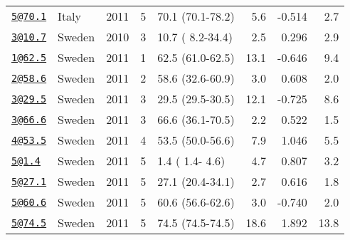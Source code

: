 \documentclass[
]{article}
\begin{document}
\begin{longtable}[]{@{}llrrlrrr@{}}
\href{mailto:5@70.1}{\nolinkurl{5@70.1}} & Italy & 2011 & 5 & 70.1 (70.1-78.2) & 5.6 & -0.514 & 2.7\tabularnewline
\href{mailto:3@10.7}{\nolinkurl{3@10.7}} & Sweden & 2010 & 3 & 10.7 ( 8.2-34.4) & 2.5 & 0.296 & 2.9\tabularnewline
\href{mailto:1@62.5}{\nolinkurl{1@62.5}} & Sweden & 2011 & 1 & 62.5 (61.0-62.5) & 13.1 & -0.646 & 9.4\tabularnewline
\href{mailto:2@58.6}{\nolinkurl{2@58.6}} & Sweden & 2011 & 2 & 58.6 (32.6-60.9) & 3.0 & 0.608 & 2.0\tabularnewline
\href{mailto:3@29.5}{\nolinkurl{3@29.5}} & Sweden & 2011 & 3 & 29.5 (29.5-30.5) & 12.1 & -0.725 & 8.6\tabularnewline
\href{mailto:3@66.6}{\nolinkurl{3@66.6}} & Sweden & 2011 & 3 & 66.6 (36.1-70.5) & 2.2 & 0.522 & 1.5\tabularnewline
\href{mailto:4@53.5}{\nolinkurl{4@53.5}} & Sweden & 2011 & 4 & 53.5 (50.0-56.6) & 7.9 & 1.046 & 5.5\tabularnewline
\href{mailto:5@1.4}{\nolinkurl{5@1.4}} & Sweden & 2011 & 5 & 1.4 ( 1.4- 4.6) & 4.7 & 0.807 & 3.2\tabularnewline
\href{mailto:5@27.1}{\nolinkurl{5@27.1}} & Sweden & 2011 & 5 & 27.1 (20.4-34.1) & 2.7 & 0.616 & 1.8\tabularnewline
\href{mailto:5@60.6}{\nolinkurl{5@60.6}} & Sweden & 2011 & 5 & 60.6 (56.6-62.6) & 3.0 & -0.740 & 2.0\tabularnewline
\href{mailto:5@74.5}{\nolinkurl{5@74.5}} & Sweden & 2011 & 5 & 74.5 (74.5-74.5) & 18.6 & 1.892 & 13.8\tabularnewline
\bottomrule
\end{longtable}

\newpage
\end{document}
